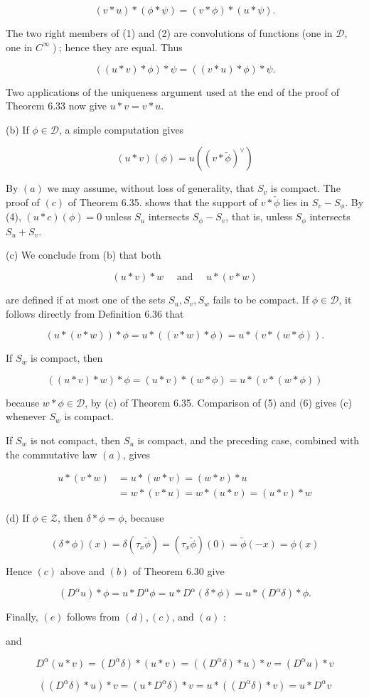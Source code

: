 \documentclass[10pt]{article}
\begin{document}
$$
(v * u) *(\phi * \psi)=(v * \phi) *(u * \psi) .
$$

The two right members of (1) and (2) are convolutions of functions (one in $\mathscr{D}$, one in $\left.C^{\infty}\right)$; hence they are equal. Thus

$$
((u * v) * \phi) * \psi=((v * u) * \phi) * \psi .
$$

Two applications of the uniqueness argument used at the end of the proof of Theorem 6.33 now give $u * v=v * u$.

(b) If $\phi \in \mathscr{D}$, a simple computation gives

$$
(u * v)(\phi)=u\left((v * \check{\phi})^{\vee}\right)
$$

By $(a)$ we may assume, without loss of generality, that $S_{v}$ is compact. The proof of $(c)$ of Theorem 6.35. shows that the support of $v * \check{\phi}$ lies in $S_{v}-S_{\phi}$. By (4), $(u * c)(\phi)=0$ unless $S_{u}$ intersects $S_{\phi}-S_{v}$, that is, unless $S_{\phi}$ intersects $S_{u}+S_{v}$.

(c) We conclude from (b) that both

$$
(u * v) * w \quad \text { and } \quad u *(v * w)
$$

are defined if at most one of the sets $S_{u}, S_{v}, S_{w}$ fails to be compact. If $\phi \in \mathscr{D}$, it follows directly from Definition 6.36 that

$$
(u *(v * w)) * \phi=u *((v * w) * \phi)=u *(v *(w * \phi)) .
$$

If $S_{w}$ is compact, then

$$
((u * v) * w) * \phi=(u * v) *(w * \phi)=u *(v *(w * \phi))
$$

because $w * \phi \in \mathscr{D}$, by (c) of Theorem 6.35. Comparison of (5) and (6) gives (c) whenever $S_{w}$ is compact.

If $S_{w}$ is not compact, then $S_{u}$ is compact, and the preceding case, combined with the commutative law $(a)$, gives

$$
\begin{aligned}
u *(v * w) & =u *(w * v)=(w * v) * u \\
& =w *(v * u)=w *(u * v)=(u * v) * w
\end{aligned}
$$

(d) If $\phi \in \mathscr{Z}$, then $\delta * \phi=\phi$, because

$$
(\delta * \phi)(x)=\delta\left(\tau_{\dot{x}} \check{\phi}\right)=\left(\tau_{x} \check{\phi}\right)(0)=\check{\phi}(-x)=\phi(x)
$$

Hence $(c)$ above and $(b)$ of Theorem 6.30 give

$$
\left(D^{\alpha} u\right) * \phi=u * D^{\alpha} \phi=u * D^{\alpha}(\delta * \phi)=u *\left(D^{\alpha} \delta\right) * \phi .
$$

Finally, $(e)$ follows from $(d),(c)$, and $(a)$ :

and

$$
D^{\alpha}(u * v)=\left(D^{\alpha} \delta\right) *(u * v)=\left(\left(D^{\alpha} \delta\right) * u\right) * v=\left(D^{\alpha} u\right) * v
$$

$$
\left(\left(D^{\alpha} \delta\right) * u\right) * v=\left(u * D^{\alpha} \delta\right) * v=u *\left(\left(D^{\alpha} \delta\right) * v\right)=u * D^{\alpha} v
$$
\end{document}
